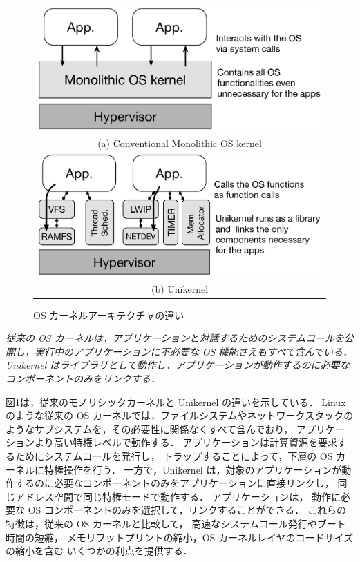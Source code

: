 \begin{figure}[t]
    \begin{center}
      \begin{tabular}{c}
        \includegraphics[scale=0.3]{./img/monolithic.eps} \\
        (a) Conventional Monolithic OS kernel       \vspace*{2mm} \\ 
        \includegraphics[scale=0.3]{./img/unikernel.eps} \\
        (b) Unikernel \\
      \end{tabular}
      \caption{OS カーネルアーキテクチャの違い}
      \label{fig:kernels}
    \end{center}
  \end{figure}
  \textit{従来の OS カーネルは，アプリケーションと対話するためのシステムコールを公開し，実行中のアプリケーションに不必要な OS 機能さえもすべて含んでいる．
  Unikernel はライブラリとして動作し，アプリケーションが動作するのに必要なコンポーネントのみをリンクする．}

図\ref{fig:kernels}は，従来のモノリシックカーネルと Unikernel の違いを示している．
Linux のような従来の OS カーネルでは，ファイルシステムやネットワークスタックのようなサブシステムを，その必要性に関係なくすべて含んでおり，
アプリケーションより高い特権レベルで動作する．
アプリケーションは計算資源を要求するためにシステムコールを発行し，
トラップすることによって，下層の OS カーネルに特権操作を行う．
一方で，Unikernel は，対象のアプリケーションが動作するのに必要なコンポーネントのみをアプリケーションに直接リンクし，
同じアドレス空間で同じ特権モードで動作する．
アプリケーションは，
動作に必要な OS コンポーネントのみを選択して，リンクすることができる．
これらの特徴は，従来の OS カーネルと比較して，
高速なシステムコール発行やブート時間の短縮，
メモリフットプリントの縮小，OS カーネルレイヤのコードサイズの縮小を含む
いくつかの利点を提供する．

